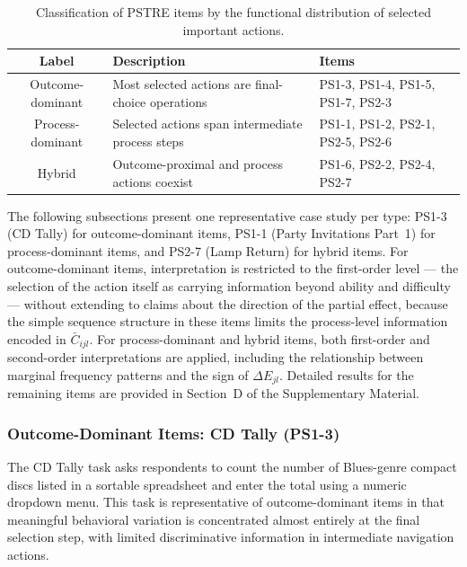 \documentclass[A4paper,11pt]{article}
\begin{document}
\begin{table}[htb]
\centering
\caption{Classification of PSTRE items by the functional distribution of selected important actions.}
\label{tab:item_types}
\hspace*{-0.9cm}
\begin{tabular}{cll}
\toprule
Label & Description & Items \\
\midrule
Outcome-dominant & Most selected actions are final-choice operations & PS1-3, PS1-4, PS1-5, PS1-7, PS2-3 \\
Process-dominant & Selected actions span intermediate process steps & PS1-1, PS1-2, PS2-1, PS2-5, PS2-6 \\
Hybrid           & Outcome-proximal and process actions coexist     & PS1-6, PS2-2, PS2-4, PS2-7 \\
\bottomrule
\end{tabular}
\end{table}

The following subsections present one representative case study per type: PS1-3 (CD Tally) for outcome-dominant items, PS1-1 (Party Invitations Part~1) for process-dominant items, and PS2-7 (Lamp Return) for hybrid items. For outcome-dominant items, interpretation is restricted to the first-order level --- the selection of the action itself as carrying information beyond ability and difficulty --- without extending to claims about the direction of the partial effect, because the simple sequence structure in these items limits the process-level information encoded in $\bar{C}_{ijl}$. For process-dominant and hybrid items, both first-order and second-order interpretations are applied, including the relationship between marginal frequency patterns and the sign of $\Delta E_{jl}$. Detailed results for the remaining items are provided in Section~D of the Supplementary Material.

\subsubsection{Outcome-Dominant Items: CD Tally (PS1-3)}

The CD Tally task asks respondents to count the number of Blues-genre compact discs listed in a sortable spreadsheet and enter the total using a numeric dropdown menu. This task is representative of outcome-dominant items in that meaningful behavioral variation is concentrated almost entirely at the final selection step, with limited discriminative information in intermediate navigation actions.
\end{document}
